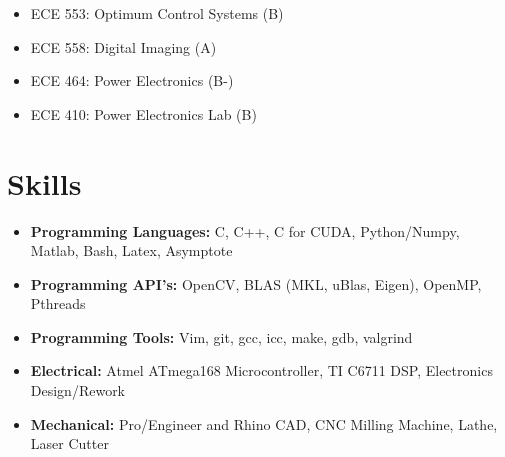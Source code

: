 \documentclass[line]{res}
\def\spaceline{\vspace{1mm} \fullline}
\begin{document}
\begin{resume}
\begin{itemize}
\begin{itemize}
\item ECE 553: Optimum Control Systems (B)
\item ECE 558: Digital Imaging (A)

\item ECE 464: Power Electronics (B-)
\item ECE 410: Power Electronics Lab (B)
\end{itemize}
\end{itemize}

	\vspace{-3mm}
	\section{Skills}
	\begin{itemize}
	\item 
	\spaceline
{\bf Programming Languages: } C, C++, C for CUDA, Python/Numpy, Matlab, Bash, Latex, Asymptote
\item {\bf Programming API's: } OpenCV, BLAS (MKL, uBlas, Eigen), OpenMP, Pthreads
\item {\bf Programming Tools: } Vim, git, gcc, icc, make, gdb, valgrind
\item {\bf Electrical: } Atmel ATmega168 Microcontroller, TI C6711 DSP, Electronics Design/Rework 
\item {\bf Mechanical: } Pro/Engineer and Rhino CAD, CNC Milling Machine, Lathe, Laser Cutter 
\end{itemize}

		\end{resume}
		
\end{document}

